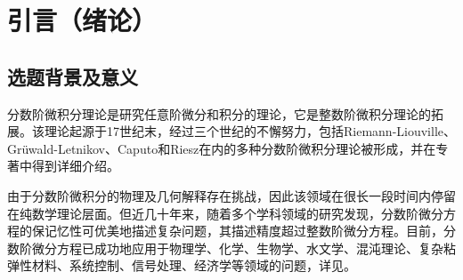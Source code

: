\chapter[引言（绪论）]{引言（绪论）}
\section{选题背景及意义}
分数阶微积分理论是研究任意阶微分和积分的理论，它是整数阶微积分理论的拓展。该理论起源于17世纪末，经过三个世纪的不懈努力，包括Riemann-Liouville、Grüwald-Letnikov、Caputo和Riesz在内的多种分数阶微积分理论被形成，并在专著\cite{samkoFractionalIntegralsDerivatives1993}中得到详细介绍。

由于分数阶微积分的物理及几何解释存在挑战，因此该领域在很长一段时间内停留在纯数学理论层面。但近几十年来，随着多个学科领域的研究发现，分数阶微分方程的保记忆性可优美地描述复杂问题，其描述精度超过整数阶微分方程。目前，分数阶微分方程已成功地应用于物理学、化学、生物学、水文学、混沌理论、复杂粘弹性材料、系统控制、信号处理、经济学等领域的问题，详见\cite{liIntroductionFractionalCalculus2015,HandbookDifferentialEquations2008,brychkovIndefiniteIntegrals2008,zhangMassBalanceBased2005,carrerasAnomalousDiffusionExit2001,hilferFRACTIONALCALCULUSREGULAR2000,liangRobustnessFractionalorderBoundary2007,maginSolvingFractionalOrder2009,zaslavskySelfsimilarTransportIncomplete1993,sunRandomorderFractionalDifferential2011}。

